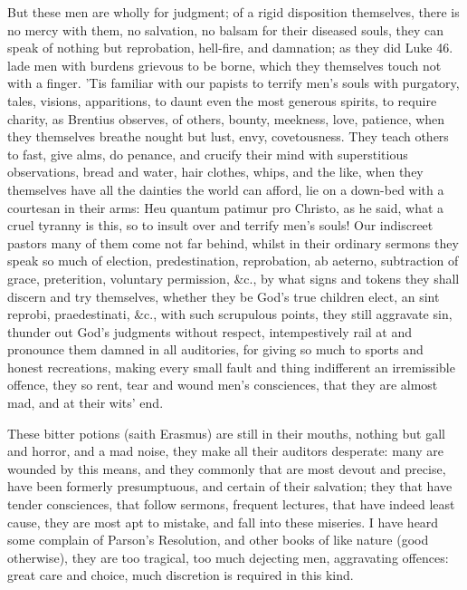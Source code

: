 {But these men are wholly for judgment; of a rigid disposition
themselves, there is no mercy with them, no salvation, no balsam for
their diseased souls, they can speak of nothing but reprobation,
hell-fire, and damnation; as they did Luke  46. lade men with
burdens grievous to be borne, which they themselves touch not with a
finger. 'Tis familiar with our papists to terrify men's souls with
purgatory, tales, visions, apparitions, to daunt even the most generous
spirits, to require charity, as Brentius observes, of others,
bounty, meekness, love, patience, when they themselves breathe nought
but lust, envy, covetousness. They teach others to fast, give alms, do
penance, and crucify their mind with superstitious observations, bread
and water, hair clothes, whips, and the like, when they themselves have
all the dainties the world can afford, lie on a down-bed with a
courtesan in their arms: Heu quantum patimur pro Christo, as he
said, what a cruel tyranny is this, so to insult over and terrify men's
souls! Our indiscreet pastors many of them come not far behind, whilst
in their ordinary sermons they speak so much of election,
predestination, reprobation, ab aeterno, subtraction of grace,
preterition, voluntary permission, \&c., by what signs and tokens they
shall discern and try themselves, whether they be God's true children
elect, an sint reprobi, praedestinati, \&c., with such scrupulous
points, they still aggravate sin, thunder out God's judgments without
respect, intempestively rail at and pronounce them damned in all
auditories, for giving so much to sports and honest recreations, making
every small fault and thing indifferent an irremissible offence, they
so rent, tear and wound men's consciences, that they are almost mad,
and at their wits' end.

These bitter potions (saith Erasmus) are still in their mouths,
nothing but gall and horror, and a mad noise, they make all their
auditors desperate: many are wounded by this means, and they commonly
that are most devout and precise, have been formerly presumptuous, and
certain of their salvation; they that have tender consciences, that
follow sermons, frequent lectures, that have indeed least cause, they
are most apt to mistake, and fall into these miseries. I have heard
some complain of Parson's Resolution, and other books of like nature
(good otherwise), they are too tragical, too much dejecting men,
aggravating offences: great care and choice, much discretion is
required in this kind.

}
